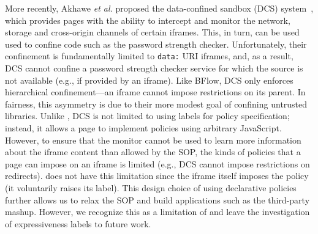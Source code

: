 More recently, Akhawe \emph{et al.} proposed the data-confined
sandbox (DCS) system~\cite{Akhawe2013}, which provides pages with the
ability to intercept and monitor the network, storage and cross-origin
channels of certain iframes.
%
This, in turn, can be used used to confine code such as the password
strength checker.
%
Unfortunately, their confinement is fundamentally limited to 
\verb|data:| URI iframes, and, as a result, DCS cannot confine a
password strength checker service for which the source is not
available (e.g., if provided by an iframe).
%
Like BFlow, DCS only enforces hierarchical confinement---an iframe
cannot impose restrictions on its parent.
%
In fairness, this asymmetry is due to their more modest goal of
confining untrusted libraries.
%
Unlike \sys{}, DCS is not limited to using labels for policy
specification; instead, it allows a page to implement policies using
arbitrary JavaScript.
%
However, to ensure that the monitor cannot be used to learn more
information about the iframe content than allowed by the SOP, the
kinds of policies that a page can impose on an iframe is limited
(e.g., DCS cannot impose restrictions on redirects).
%
\sys{} does not have this limitation since the iframe itself imposes
the policy (it voluntarily raises its label).
%
This design choice of using declarative policies further allows us to
relax the SOP and build applications such as the third-party mashup.
%
 However, we recognize this as a limitation of \sys{} and leave the
investigation of expressiveness labels to future work.




